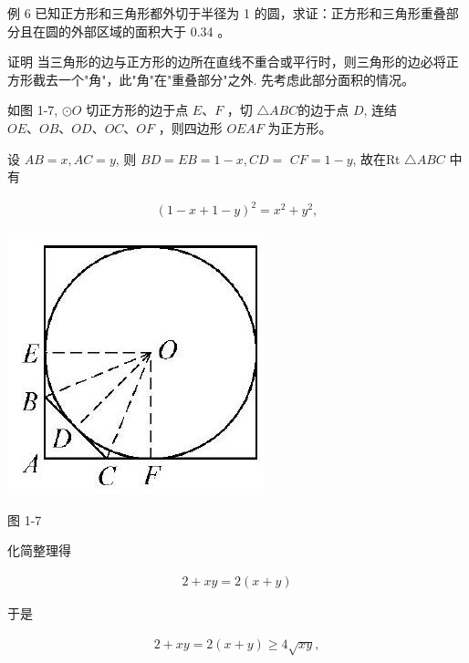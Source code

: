 \documentclass[10pt]{article}
\begin{document}
例 6 已知正方形和三角形都外切于半径为 1 的圆，求证：正方形和三角形重叠部分且在圆的外部区域的面积大于 0.34 。

证明 当三角形的边与正方形的边所在直线不重合或平行时，则三角形的边必将正方形截去一个"角"，此"角"在"重叠部分"之外. 先考虑此部分面积的情况。

如图 1-7, $\odot O$ 切正方形的边于点 $E 、 F$ ，切 $\triangle A B C$的边于点 $D$, 连结 $O E 、 O B 、 O D 、 O C 、 O F$ ，则四边形 $O E A F$ 为正方形。

设 $A B=x, A C=y$, 则 $B D=E B=1-x, C D=$ $C F=1-y$, 故在Rt $\triangle A B C$ 中有

\begin{align*}
(1-x+1-y)^{2}=x^{2}+y^{2},
\end{align*}

\begin{center}
\includegraphics[max width=\textwidth]{2024_10_30_66b8e5e701da2093c133g-014(1)}
\end{center}

图 1-7

化简整理得

\begin{align*}
2+x y=2(x+y)
\end{align*}

于是

\begin{align*}
2+x y=2(x+y) \geqslant 4 \sqrt{x y},
\end{align*}
\end{document}
